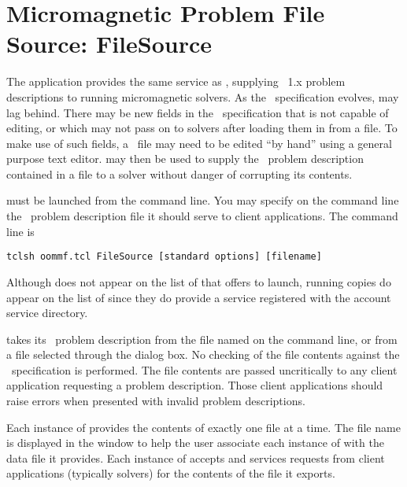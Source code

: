 \chapter{Micromagnetic Problem File Source: FileSource}\label{sec:filesource}

\begin{center}
\end{center}

The application  provides the same service as
{}, supplying
\MIF~1.x problem descriptions to running 
micromagnetic solvers.  As the \MIF\ specification evolves,
 may lag behind.  There may be new fields in the \MIF\
specification that  is not capable of editing, or which
\app{mmProbEd} may not pass on to solvers after loading them in from a
file.  To make use of such fields, a \MIF\ file may need to be edited
``by hand'' using a general purpose text editor.  \app{FileSource} may
then be used to supply the \MIF\ problem description contained in a file
to a solver without danger of corrupting its contents.

 must be launched from the command line. You may specify
on the command line the \MIF\ problem description file it should serve
to client applications.  The command line is
\begin{verbatim}
tclsh oommf.tcl FileSource [standard options] [filename]
\end{verbatim}

Although  does not appear on the list of
{} that  offers to launch, running copies do
appear on the list of \btn{Threads} since they do provide a service
registered with the account service directory.

 takes its \MIF\ problem description from the file named
on the command line, or from a file selected through the
 dialog box.  No checking of the file contents
against the \MIF\ specification is performed.  The file contents are
passed uncritically to any client application requesting a problem
description.  Those client applications should raise errors when
presented with invalid problem descriptions.

Each instance of  provides the contents of exactly one
file at a time.  The file name is displayed in the 
window to help the user associate each instance of  with
the data file it provides.  Each instance of \app{FileSource} accepts
and services requests from client applications (typically solvers) for
the contents of the file it exports.

